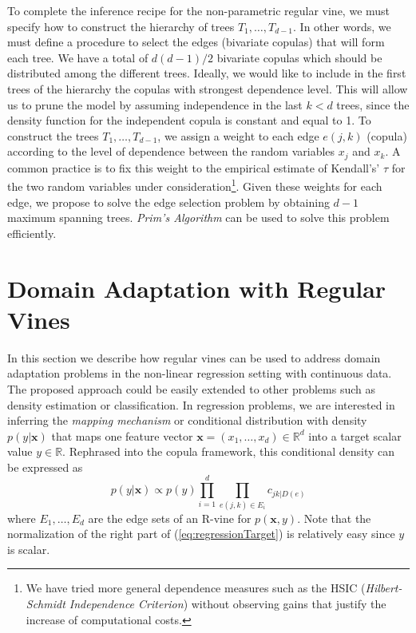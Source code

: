 \documentclass{article}
\begin{document}
To complete the inference recipe for the non-parametric regular vine, we must
specify how to construct the hierarchy of trees $T_1,\ldots,T_{d-1}$.  In other
words, we must define a procedure to select the edges (bivariate copulas) that
will form each tree.  We have a total of $d (d - 1) / 2$ bivariate copulas
which should be distributed among the different trees.  Ideally, we would like
to include in the first trees of the hierarchy the copulas with strongest
dependence level.  This will allow us to prune the model by assuming
independence in the last $k < d$ trees, since the density function for the
independent copula is constant and equal to 1.  To construct the trees
$T_1,\ldots,T_{d-1}$, we assign a weight to each edge $e(j,k)$ (copula)
according to the level of dependence between the random variables $x_j$ and
$x_k$. A common practice is to fix this weight to the empirical estimate of
Kendall's' $\tau$ for the two random variables under
consideration\cite{vines}\footnote{We have tried more general dependence
measures such as the HSIC (\emph{Hilbert-Schmidt Independence Criterion})
without observing gains that justify the increase of computational costs.}.
Given these weights for each edge, we propose to solve the edge selection
problem by obtaining $d-1$ maximum spanning trees. \emph{Prim's Algorithm}
\cite{prim} can be used to solve this problem efficiently.

\section{Domain Adaptation with Regular Vines}\label{sec:domain_adaptation}

In this section we describe how regular vines can be used to address domain
adaptation problems in the non-linear regression setting with continuous data.
The proposed approach could be easily extended to other problems such as
density estimation or classification.  In regression problems, we are
interested in inferring the \emph{mapping mechanism} or conditional
distribution with density $p(y|\mathbf{x})$ that maps one feature vector
$\mathbf{x}=(x_1,\ldots,x_d) \in \mathbb{R}^d$ into a target scalar value $y
\in \mathbb{R}$.  Rephrased into the copula framework, this conditional density
can be expressed as \begin{equation} p(y|\mathbf{x}) \propto p(y)
\prod_{i=1}^{d} \prod_{e(j,k) \in E_i} c_{jk|D(e)} \label{eq:regressionTarget}
\end{equation} where $E_1,\ldots,E_{d}$ are the edge sets of an R-vine for
$p(\mathbf{x},y)$.  Note that the normalization of the right part of
(\ref{eq:regressionTarget}) is relatively easy since $y$ is scalar.
\end{document}
